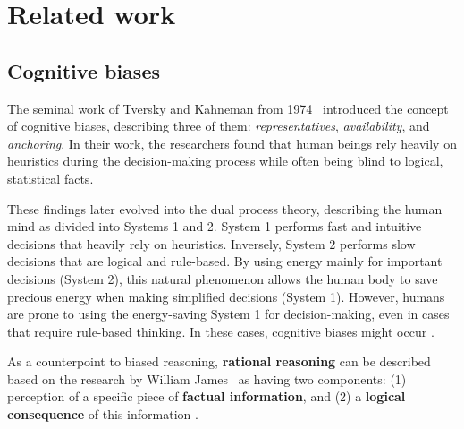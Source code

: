 \section{Related work}
\label{sec:related_work}
    
    \subsection{Cognitive biases}
    The seminal work of Tversky and Kahneman from 1974~\cite{Tversky1974} introduced the concept of cognitive biases, describing three of them: \textit{representatives}, \textit{availability}, and \textit{anchoring}. In their work, the researchers found that human beings rely heavily on heuristics during the decision-making process while often being blind to logical, statistical facts.  

    These findings later evolved into the dual process theory, describing the human mind as divided into Systems 1 and 2. System 1 performs fast and intuitive decisions that heavily rely on heuristics. Inversely, System 2 performs slow decisions that are logical and rule-based. By using energy mainly for important decisions (System 2), this natural phenomenon allows the human body to save precious energy when making simplified decisions (System 1).
    However, humans are prone to using the energy-saving System 1 for decision-making, even in cases that require rule-based thinking. In these cases, cognitive biases might occur \cite{kahneman2011think}. 

    As a counterpoint to biased reasoning, \textbf{rational reasoning} can be described based on the research by William James~\cite{james1890} as having two components: (1) perception of a specific piece of \textbf{factual information}, and (2) a \textbf{logical consequence} of this information \cite{james1890}. 

    \noindent
    
    
